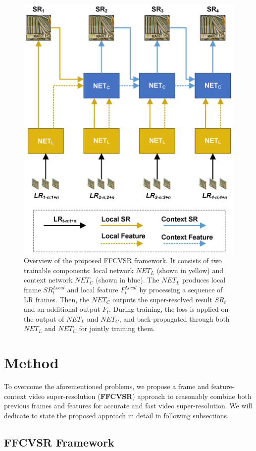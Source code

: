 \documentclass[letterpaper]{article} %
\begin{document}
\begin{figure}[t]
\centering
\includegraphics[width=7 cm]{Fig3.png}
\caption{Overview of the proposed FFCVSR framework. It consists of two trainable components: local network $NET_L$ (shown in yellow) and context network $NET_C$ (shown in blue). The $NET_L$ produces local frame $SR^{Local}_t$ and local feature $F^{Local}_t$ by processing a sequence of LR frames. Then, the $NET_C$ outputs the super-resolved result $SR_t$ and an additional output $F_t$. During training, the loss is applied on the output of $NET_L$ and $NET_C$, and back-propagated through both $NET_L$ and $NET_C$ for jointly training them.}
\label{proposedFramwork}
\end{figure}





\section{Method}


To overcome the aforementioned problems, we propose a frame and feature-context video super-resolution (\textbf{FFCVSR}) approach to reasonably combine both previous frames and features for accurate and fast video super-resolution. We will dedicate to state the proposed approach in detail in following subsections.


\subsection{FFCVSR Framework}
\end{document}

